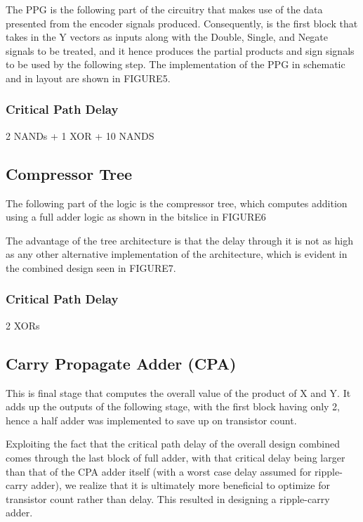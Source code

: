 \documentclass[conference]{IEEEtran}
\begin{document}
The PPG is the following part of the circuitry that makes use of the data presented from the encoder signals produced. Consequently, is the first block that takes in the Y vectors as inputs along with the Double, Single, and Negate signals to be treated, and it hence produces the partial products and sign signals to be used by the following step. The implementation of the PPG in schematic and in layout are shown in FIGURE5.

\subsubsection{Critical Path Delay}

2 NANDs + 1 XOR + 10 NANDS


\subsection{Compressor Tree}

The following part of the logic is the compressor tree, which computes addition using a full adder logic as shown in the bitslice in FIGURE6

The advantage of the tree architecture is that the delay through it is not as high as any other alternative implementation of the architecture, which is evident in the combined design seen in FIGURE7.

\subsubsection{Critical Path Delay}

2 XORs


\subsection{Carry Propagate Adder (CPA)}

This is final stage that computes the overall value of the product of X and Y. It adds up the outputs of the following stage, with the first block having only 2, hence a half adder was implemented to save up on transistor count.

Exploiting the fact that the critical path delay of the overall design combined comes through the last block of full adder, with that critical delay being larger than that of the CPA adder itself (with a worst case delay assumed for ripple-carry adder), we realize that it is ultimately more beneficial to optimize for transistor count rather than delay. This resulted in designing a ripple-carry adder.
\end{document}
